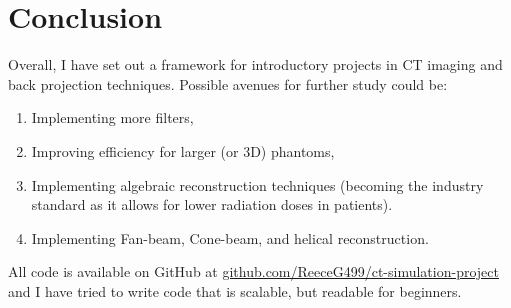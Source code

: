 \documentclass{article}
\theoremstyle{definition}
\begin{document}
\section{Conclusion}
Overall, I have set out a framework for introductory projects in CT imaging and back projection techniques. Possible avenues for further study could be:
\begin{enumerate}
\item Implementing more filters,
\item Improving efficiency for larger (or 3D) phantoms,
\item Implementing algebraic reconstruction techniques (becoming the industry standard as it allows for lower radiation doses in patients).
\item Implementing Fan-beam, Cone-beam, and helical reconstruction.
\end{enumerate}
All code is available on GitHub at \url{github.com/ReeceG499/ct-simulation-project} and I have tried to write code that is scalable, but readable for beginners.



\end{document}
